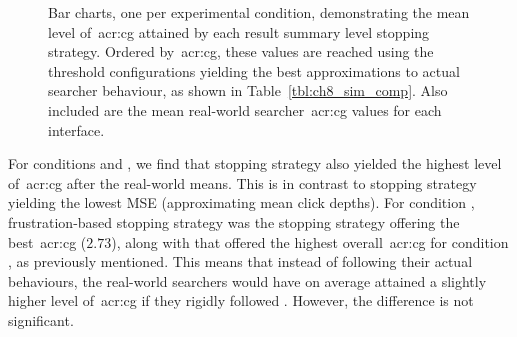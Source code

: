 \begin{figure}[p!]
    \centering
    \caption[Simulated and real-world~\gls{acr:cg} rankings]{Bar charts, one per experimental condition, demonstrating the mean level of~\gls{acr:cg} attained by each result summary level stopping strategy. Ordered by~\gls{acr:cg}, these values are reached using the threshold configurations yielding the best approximations to actual searcher behaviour, as shown in Table~\ref{tbl:ch8_sim_comp}. Also included are the mean real-world searcher~\gls{acr:cg} values for each interface.}
    \label{fig:ch8_sim_comparison_rankings}
\end{figure}

For conditions  and , we find that stopping strategy  also yielded the highest level of~\gls{acr:cg} after the real-world means. This is in contrast to stopping strategy  yielding the lowest MSE (approximating mean click depths). For condition , frustration-based stopping strategy  was the stopping strategy offering the best~\gls{acr:cg} ($2.73$), along with  that offered the highest overall~\gls{acr:cg} for condition , as previously mentioned. This means that instead of following their actual behaviours, the real-world searchers would have on average attained a slightly higher level of~\gls{acr:cg} if they rigidly followed . However, the difference is not significant.

